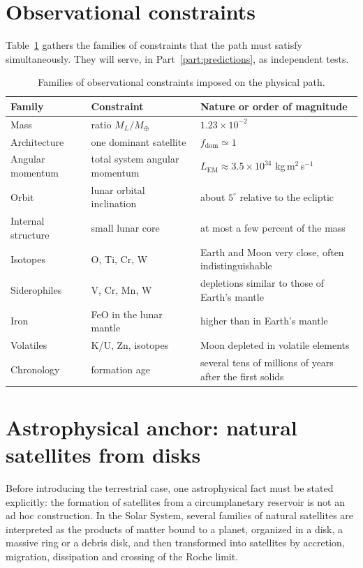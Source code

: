 \documentclass[11pt,a4paper,openany]{report}
\newcommand{\Mt}{M_{\oplus}}
\begin{document}
\section{Observational constraints}

Table~\ref{tab:contraintes} gathers the families of constraints that the path must satisfy
simultaneously. They will serve, in Part~\ref{part:predictions}, as independent tests.

\begin{table}[htbp]
\centering
\small
\caption{Families of observational constraints imposed on the physical path.}
\label{tab:contraintes}
\begin{tabularx}{\textwidth}{>{\raggedright\arraybackslash}p{2.6cm}
>{\raggedright\arraybackslash}X >{\raggedright\arraybackslash}p{5.4cm}}
\toprule
\textbf{Family} & \textbf{Constraint} & \textbf{Nature or order of magnitude} \\
\midrule
Mass & ratio $M_L/\Mt$ & $1.23\times10^{-2}$ \\
Architecture & one dominant satellite & $f_{\mathrm{dom}}\simeq1$ \\
Angular momentum & total system angular momentum & $L_{\mathrm{EM}}\approx3.5\times10^{34}$ kg\,m$^2$\,s$^{-1}$ \\
Orbit & lunar orbital inclination & about $5^\circ$ relative to the ecliptic \\
Internal structure & small lunar core & at most a few percent of the mass \\
Isotopes & O, Ti, Cr, W & Earth and Moon very close, often indistinguishable \\
Siderophiles & V, Cr, Mn, W & depletions similar to those of Earth's mantle \\
Iron & FeO in the lunar mantle & higher than in Earth's mantle \\
Volatiles & K/U, Zn, isotopes & Moon depleted in volatile elements \\
Chronology & formation age & several tens of millions of years after the first solids \\
\bottomrule
\end{tabularx}
\end{table}


\section{Astrophysical anchor: natural satellites from disks}

Before introducing the terrestrial case, one astrophysical fact must be stated explicitly: the
formation of satellites from a circumplanetary reservoir is not an ad hoc construction. In the
Solar System, several families of natural satellites are interpreted as the products of matter
bound to a planet, organized in a disk, a massive ring or a debris disk, and then transformed into
satellites by accretion, migration, dissipation and crossing of the Roche limit.
\end{document}
